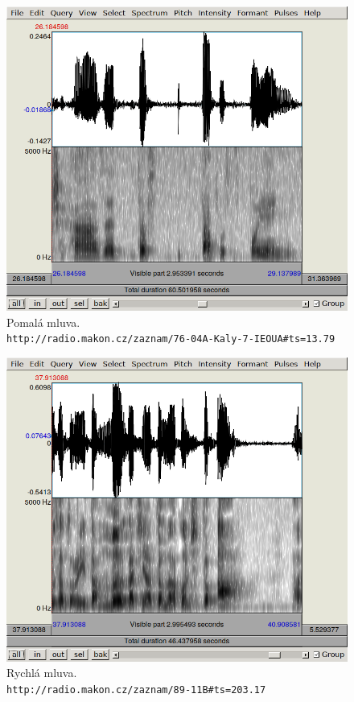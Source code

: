 \begin{figure}[htpb]
\includegraphics[scale=0.88]{rc/spectrum-pomala-mluva-76-04A.png}
\caption{
    Pomalá mluva.\\
    \texttt{http://radio.makon.cz/zaznam/76-04A-Kaly-7-IEOUA\#ts=13.79}
}
\label{fig:spectr-slowtalk}
\end{figure}

\begin{figure}[htpb]
\includegraphics[scale=0.88]{rc/spectrum-rychla-mluva-89-11B.png}
\caption{
    Rychlá mluva.\\
    \texttt{http://radio.makon.cz/zaznam/89-11B\#ts=203.17}
}
\label{fig:spectr-fasttalk}
\end{figure}

